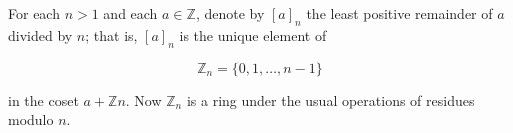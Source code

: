 For each $n > 1$ and each $a \in \mathbb{Z}$, denote by $[a]_n$ the least positive remainder of $a$ divided by $n$; that is, $[a]_n$ is the unique element of

$$\mathbb{Z}_n = \{0, 1, \ldots, n - 1\}$$

in the coset $a + \mathbb{Z}n$. Now $\mathbb{Z}_n$ is a ring under the usual operations of residues modulo $n$.
